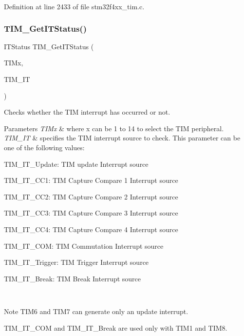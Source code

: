 Definition at line 2433 of file stm32f4xx\+\_\+tim.\+c.

\mbox{\label{group___t_i_m___group5_ga0827a0b411707304f76d33050727c24d}} 
\subsubsection{\texorpdfstring{T\+I\+M\+\_\+\+Get\+I\+T\+Status()}{TIM\_GetITStatus()}}
{\footnotesize\ttfamily I\+T\+Status T\+I\+M\+\_\+\+Get\+I\+T\+Status (\begin{DoxyParamCaption}\item[{\hyperlink{struct_t_i_m___type_def}{T\+I\+M\+\_\+\+Type\+Def} $\ast$}]{T\+I\+Mx,  }\item[{uint16\+\_\+t}]{T\+I\+M\+\_\+\+IT }\end{DoxyParamCaption})}



Checks whether the T\+IM interrupt has occurred or not. 


\begin{DoxyParams}{Parameters}
{\em T\+I\+Mx} & where x can be 1 to 14 to select the T\+IM peripheral. \\
\hline
{\em T\+I\+M\+\_\+\+IT} & specifies the T\+IM interrupt source to check. This parameter can be one of the following values\+: \begin{DoxyItemize}
\item T\+I\+M\+\_\+\+I\+T\+\_\+\+Update\+: T\+IM update Interrupt source \item T\+I\+M\+\_\+\+I\+T\+\_\+\+C\+C1\+: T\+IM Capture Compare 1 Interrupt source \item T\+I\+M\+\_\+\+I\+T\+\_\+\+C\+C2\+: T\+IM Capture Compare 2 Interrupt source \item T\+I\+M\+\_\+\+I\+T\+\_\+\+C\+C3\+: T\+IM Capture Compare 3 Interrupt source \item T\+I\+M\+\_\+\+I\+T\+\_\+\+C\+C4\+: T\+IM Capture Compare 4 Interrupt source \item T\+I\+M\+\_\+\+I\+T\+\_\+\+C\+OM\+: T\+IM Commutation Interrupt source \item T\+I\+M\+\_\+\+I\+T\+\_\+\+Trigger\+: T\+IM Trigger Interrupt source \item T\+I\+M\+\_\+\+I\+T\+\_\+\+Break\+: T\+IM Break Interrupt source\end{DoxyItemize}
\\
\hline
\end{DoxyParams}
\begin{DoxyNote}{Note}
T\+I\+M6 and T\+I\+M7 can generate only an update interrupt. 

T\+I\+M\+\_\+\+I\+T\+\_\+\+C\+OM and T\+I\+M\+\_\+\+I\+T\+\_\+\+Break are used only with T\+I\+M1 and T\+I\+M8.
\end{DoxyNote}

